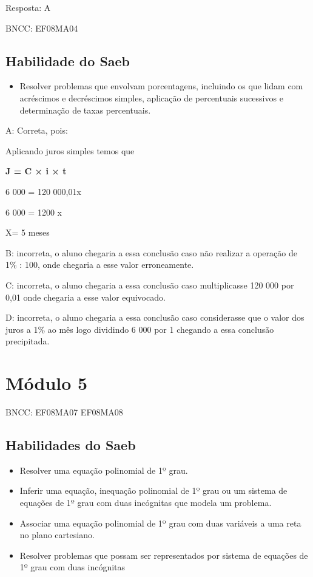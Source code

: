 Resposta: A

BNCC: EF08MA04

\section{Habilidade do Saeb}

\begin{itemize}
\tightlist

\item 
  Resolver problemas que envolvam porcentagens, incluindo os que lidam
  com acréscimos e decréscimos simples, aplicação de percentuais
  sucessivos e determinação de taxas percentuais.
\end{itemize}

A: Correta, pois:

Aplicando juros simples temos que

\textbf{J = C × i × t}

6 000 = 120 000,01\times x

6 000 = 1200 x

X= 5 meses

B: incorreta, o aluno chegaria a essa conclusão caso não realizar a
operação de 1\% : 100, onde chegaria a esse valor erroneamente.

C: incorreta, o aluno chegaria a essa conclusão caso multiplicasse 120
000 por 0,01 onde chegaria a esse valor equivocado.

D: incorreta, o aluno chegaria a essa conclusão caso considerasse que o
valor dos juros a 1\% ao mês logo dividindo 6 000 por 1 chegando a essa
conclusão precipitada.

\chapter{Módulo 5}

BNCC: EF08MA07 EF08MA08

\section{Habilidades do Saeb}

\begin{itemize}

\item 
  Resolver uma equação polinomial de 1º grau.

\item 
  Inferir uma equação, inequação polinomial de 1º grau ou um sistema de
  equações de 1º grau com duas incógnitas que modela um problema.

\item 
  Associar uma equação polinomial de 1º grau com duas variáveis a uma
  reta no plano cartesiano.

\item 
  Resolver problemas que possam ser representados por sistema de
  equações de 1º grau com duas incógnitas
\end{itemize}

